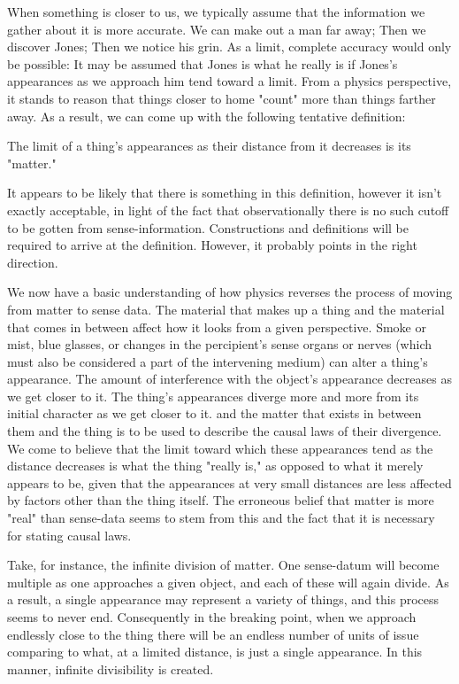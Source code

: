 \documentclass[a4paper,12pt]{book}[2004/02/16]
\theoremstyle{ilemma}
\theoremstyle{itheorem}
\theoremstyle{iother}
\theoremstyle{icorollary}
\theoremstyle{numcorollary}
\theoremstyle{idefinition}
\begin{document}
When something is closer to us, we typically assume that the information we gather about it is more accurate. We can make out a man far away; Then we discover Jones; Then we notice his grin. As a limit, complete accuracy would only be possible: It may be assumed that Jones is what he really is if Jones's appearances as we approach him tend toward a limit. From a physics perspective, it stands to reason that things closer to home "count" more than things farther away. As a result, we can come up with the following tentative definition:

The limit of a thing's appearances as their distance from it decreases is its "matter."

It appears to be likely that there is something in this definition, however it
isn't exactly acceptable, in light of the fact that observationally there is no such cutoff
to be gotten from sense-information. Constructions and definitions will be required to arrive at the definition. However, it probably points in the right direction.

We now have a basic understanding of how physics reverses the process of moving from matter to sense data. The material that makes up a thing and the material that comes in between affect how it looks from a given perspective. Smoke or mist, blue glasses, or changes in the percipient's sense organs or nerves (which must also be considered a part of the intervening medium) can alter a thing's appearance. The amount of interference with the object's appearance decreases as we get closer to it. The thing's appearances diverge more and more from its initial character as we get closer to it. and the matter that exists in between them and the thing is to be used to describe the causal laws of their divergence. We come to believe that the limit toward which these appearances tend as the distance decreases is what the thing "really is," as opposed to what it merely appears to be, given that the appearances at very small distances are less affected by factors other than the thing itself.
The erroneous belief that matter is more "real" than sense-data seems to stem from this and the fact that it is necessary for stating causal laws.

Take, for instance, the infinite division of matter. One sense-datum will become multiple as one approaches a given object, and each of these will again divide. As a result, a single appearance may represent a variety of things, and this process seems to never end.
Consequently in the breaking point, when we approach endlessly close to the thing
there will be an endless number of units of issue comparing to
what, at a limited distance, is just a single appearance. In this manner, infinite divisibility is created.
\end{document}
